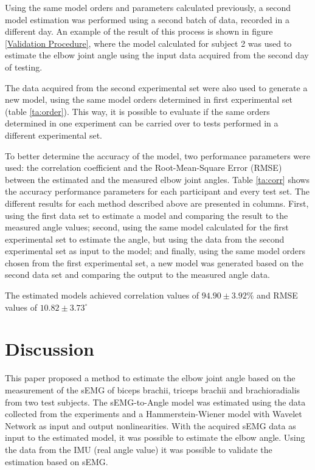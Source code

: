 \documentclass[letterpaper, 10 pt, conference]{ieeeconf}  %
\begin{document}
Using the same model orders and parameters calculated previously, a second model estimation was performed using a second batch of data, recorded in a different day. An example of the result of this process is shown in figure \ref{Validation Procedure}, where the model calculated for subject 2 was used to estimate the elbow joint angle using the input data acquired from the second day of testing.

The data acquired from the second experimental set were also used to generate a new model, using the same model orders determined in first experimental set (table \ref{ta:order}). This way, it is possible to evaluate if the same orders determined in one experiment can be carried over to tests performed in a different experimental set.

   


To better determine the accuracy of the model, two performance parameters were used: the correlation coefficient and the Root-Mean-Square Error (RMSE) between the estimated and the measured elbow joint angles. Table \ref{ta:corr} shows the accuracy performance parameters for each participant and every test set. The different results for each method described above are presented in columns. First, using the first data set to estimate a model and comparing the result to the measured angle values; second, using the same model calculated for the first experimental set to estimate the angle, but using the data from the second experimental set as input to the model; and finally, using the same model orders chosen from the first experimental set, a new model was generated based on the second data set and comparing the output to the measured angle data.

The estimated models achieved correlation values of $94.90 \pm 3.92\%$ and RMSE values of $10.82 \pm 3.73^\circ$


\section{Discussion}

This paper proposed a method to estimate the elbow joint angle based on the measurement of the sEMG of biceps brachii, triceps brachii and brachioradialis from two test subjects. The sEMG-to-Angle model was estimated using the data collected from the experiments and a Hammerstein-Wiener model with Wavelet Network as input and output nonlinearities. With the acquired sEMG data as input to the estimated model, it was possible to estimate the elbow angle. Using the data from the IMU (real angle value) it was possible to validate the estimation based on sEMG.
\end{document}
